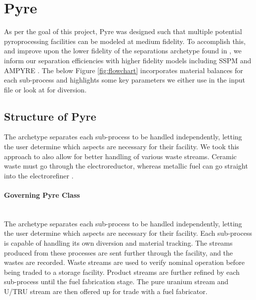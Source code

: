 \section{Pyre}

As per the goal of this project, Pyre was designed such that multiple potential pyroprocessing facilities can be modeled at medium fidelity. To accomplish this, and improve upon
the lower fidelity of the separations archetype found in \Cycamore, we inform our separation efficiencies with higher fidelity models including SSPM and AMPYRE \cite{cipiti_modeling_2012,maggos_update_2015}. The below Figure \ref{fig:flowchart} incorporates material balances for each sub-process and highlights some key parameters we
either use in the input file or look at for diversion.

\subsection{Structure of Pyre}

The archetype separates each sub-process to be handled independently, letting the user determine which aspects are necessary for their facility. We took this approach to also
allow for better handling of various waste streams. Ceramic waste must go through the electroreductor, whereas metallic fuel can go straight into the electrorefiner \cite{michael_f._simpson_developments_2012}. 
\paragraph{Governing Pyre Class} \mbox{}\\
The archetype separates each sub-process to be handled independently, letting the user determine which aspects are necessary for their facility. Each sub-process is capable
of handling its own diversion and material tracking. The streams produced from these processes are sent further through the facility, and the wastes are recorded. Waste streams are
used to verify nominal operation before being traded to a storage facility. Product streams are further refined by each sub-process until the fuel fabrication stage.
The pure uranium stream and U/TRU stream are then offered up for trade with a fuel fabricator.

\FloatBarrier

